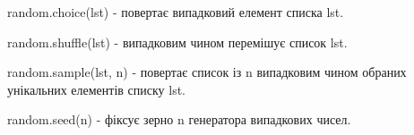 \begin{frame}
random.choice(lst) - повертає випадковий елемент списка lst.

random.shuffle(lst) - випадковим чином перемішує список lst.

random.sample(lst, n) - повертає список із n випадковим чином обраних унікальних елементів списку lst.

random.seed(n) - фіксує зерно n генератора випадкових чисел.
\end{frame}
